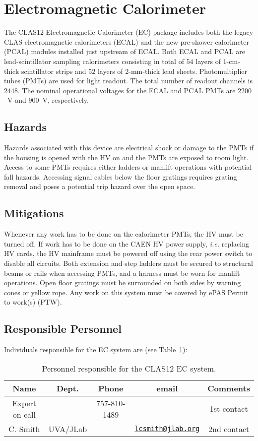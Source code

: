 \section{Electromagnetic Calorimeter}

The CLAS12 Electromagnetic Calorimeter (EC) package includes both the legacy CLAS 
electromagnetic calorimeters (ECAL) and the new pre-shower calorimeter (PCAL) modules 
installed just upstream of ECAL. Both ECAL and PCAL are lead-scintillator sampling 
calorimeters consisting in total of $54$ layers of 1-cm-thick scintillator strips and 
$52$ layers of 2-mm-thick lead sheets. Photomultiplier tubes (PMTs) are used for light 
readout. The total number of readout channels is $2448$. The nominal operational voltages 
for the ECAL and PCAL PMTs are $2200$~V and $900$~V, respectively. 

\subsection{Hazards} 

Hazards associated with this device are electrical shock or damage to the PMTs if the 
housing is opened with the HV on and the PMTs are exposed to room light.  Access to some 
PMTs requires either ladders or manlift operations with potential fall hazards. Accessing 
signal cables below the floor gratings requires grating removal and poses a potential trip 
hazard over the open space. 

\subsection{Mitigations}

Whenever any work has to be done on the calorimeter PMTs, the HV must be turned off. If work 
has to be done on the CAEN HV power supply, {\it i.e.} replacing HV cards, the HV mainframe must 
be powered off using the rear power switch to disable all circuits. Both extension and step 
ladders must be secured to structural beams or rails when accessing PMTs, and a harness must 
be worn for manlift operations. Open floor gratings must be surrounded on both sides by 
warning cones or yellow rope.  Any work on this system must be covered by ePAS Permit to work(s) (PTW).

\subsection{Responsible Personnel}

Individuals responsible for the EC system are (see Table~\ref{tb:ec}):

\begin{table}[!htb]
\centering
\begin{tabular}{|c|c|c|c|c|} \hline
Name&Dept.&Phone&email&Comments \\ \hline
Expert on call& &757-810-1489&& 1st contact \\ \hline
C. Smith &UVA/JLab&&\href{mailto:lcsmith@jlab.org}{\nolinkurl{lcsmith@jlab.org}}&2nd contact \\ \hline
\end{tabular}
\caption{Personnel responsible for the CLAS12 EC system.} 
\label{tb:ec}
\end{table}

